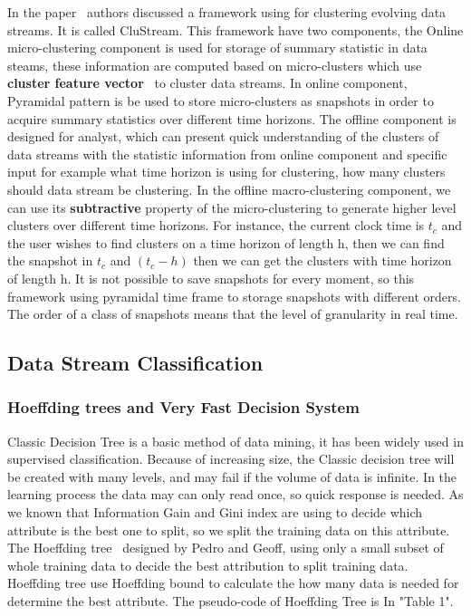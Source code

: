 \documentclass{report}
\begin{document}
In the paper~\cite{aggarwal2003framework} authors discussed a framework using for clustering evolving data streams.
It is called CluStream. This framework have two components, the Online micro-clustering component is used for storage of summary statistic in data steams, these information are computed based on micro-clusters which use \textbf{cluster feature vector}~\cite{zhang1996birch} to cluster data streams.
In online component, Pyramidal pattern is be used to store micro-clusters as snapshots in order to acquire summary statistics over different time horizons. The offline component is designed for analyst, which can present quick understanding of the clusters of data streams with the statistic information from online component and specific input for example what time horizon is using for clustering, how many clusters should data stream be clustering. In the offline macro-clustering component, we can use its \textbf{subtractive} property of the micro-clustering to generate higher level clusters over different time horizons. For instance, the current clock time is $t_c$ and the user wishes to find clusters on a time horizon of length h, then we can find the snapshot in $t_c$ and $(t_c - h)$ then we can get the clusters with time horizon of length h. It is not possible to save snapshots for every moment, so this framework using pyramidal time frame to storage snapshots with different orders. The order of a class of snapshots means that the level of granularity in real time.


\subsection{Data Stream Classification}

\subsubsection{Hoeffding trees and Very Fast Decision System}

Classic Decision Tree is a basic method of data mining, it has been widely used in supervised classification. Because of increasing size, the Classic decision tree will be created with many levels, and may fail if the volume of data is infinite. In the learning process the data may can only read once, so quick response is needed. As we known that Information Gain and Gini index are using to decide which attribute is the best one to split, so we split the training data on this attribute. The Hoeffding tree~\cite{domingos2000mining} designed by Pedro and Geoff, using only a small subset of whole training data to decide the best attribution to split training data. Hoeffding tree use Hoeffding bound to calculate the how many data is needed for determine the best attribute. The pseudo-code of Hoeffding Tree is In "Table 1".
\end{document}
